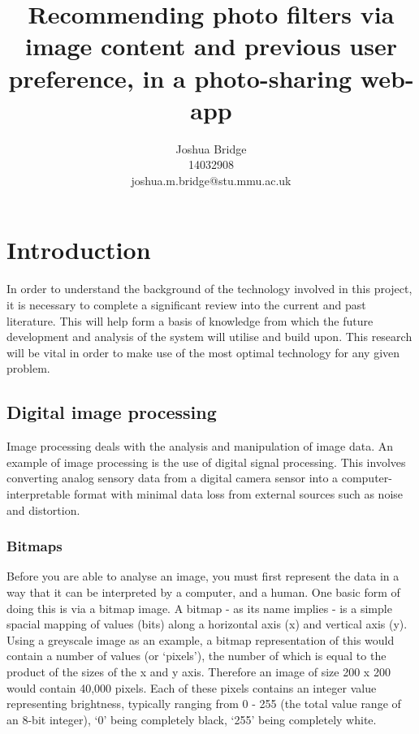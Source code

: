 \documentclass[a4paper,12pt]{report}
\title{Recommending photo filters via image content and previous user preference, in a photo-sharing web-app}
\author{Joshua Bridge \\14032908 \\joshua.m.bridge@stu.mmu.ac.uk}
\begin{document}
\maketitle

\doublespacing

\tableofcontents

\chapter{Introduction}
  In order to understand the background of the technology involved in this project, it is necessary to complete a significant review into the current and past literature. This will help form a basis of knowledge from which the future development and analysis of the system will utilise and build upon. This research will be vital in order to make use of the most optimal technology for any given problem.

  \section{Digital image processing}
    Image processing deals with the analysis and manipulation of image data. An example of image processing is the use of digital signal processing. This involves converting analog sensory data from a digital camera sensor into a computer-interpretable format with minimal data loss from external sources such as noise and distortion.\\

    \subsection{Bitmaps}
      Before you are able to analyse an image, you must first represent the data in a way that it can be interpreted by a computer, and a human. One basic form of doing this is via a bitmap image. A bitmap - as its name implies - is a simple spacial mapping of values (bits) along a horizontal axis (x) and vertical axis (y). Using a greyscale image as an example, a bitmap representation of this would contain a number of values (or ‘pixels’), the number of which is equal to the product of the sizes of the x and y axis. Therefore an image of size 200 x 200 would contain 40,000 pixels. Each of these pixels contains an integer value representing brightness, typically ranging from 0 - 255 (the total value range of an 8-bit integer), ‘0’ being completely black, ‘255’ being completely white.\\
\end{document}
